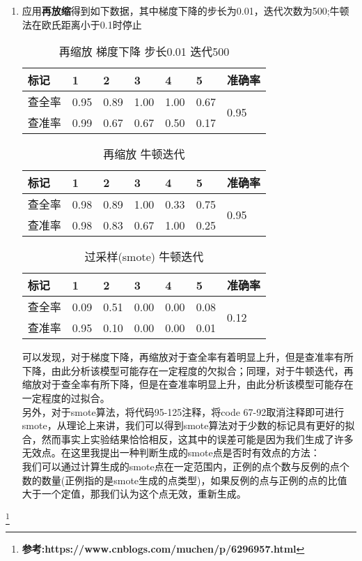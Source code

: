 \documentclass[a4paper,UTF8]{article}
\numberwithin{equation}{section}
\begin{document}
\begin{enumerate}[(1)]
	\item 应用\textbf{再放缩}得到如下数据，其中梯度下降的步长为0.01，迭代次数为500;牛顿法在欧氏距离小于0.1时停止
		\begin{table}[!h]
		\centering
		\caption{再缩放 梯度下降 步长0.01 迭代500}
		\label{}
		\begin{tabular}{l|llllll}
			\hline
			标记  & 1    & 2    & 3    & 4    & 5    & 准确率                   \\ \hline
			查全率 & 0.95 & 0.89 & 1.00 & 1.00 & 0.67 & \multirow{2}{*}{0.95} \\ \cline{1-1}
			查准率 & 0.99 & 0.67 & 0.67 & 0.50 & 0.17 &                       \\ \hline
		\end{tabular}
	\end{table}
	
	\begin{table}[!h]
		\centering
		\caption{再缩放 牛顿迭代}
		\label{}
		\begin{tabular}{l|llllll}
			\hline
			标记  & 1    & 2    & 3    & 4    & 5    & 准确率                   \\ \hline
			查全率 & 0.98 & 0.89 & 1.00 & 0.33 & 0.75 & \multirow{2}{*}{0.95} \\ \cline{1-1}
			查准率 & 0.98 & 0.83 & 0.67 & 1.00 & 0.25 &                       \\ \hline
		\end{tabular}
	\end{table}

	\begin{table}[!h]
	\centering
	\caption{过采样(smote) 牛顿迭代}
	\label{}
	\begin{tabular}{l|llllll}
		\hline
		标记  & 1    & 2    & 3    & 4    & 5    & 准确率                   \\ \hline
		查全率 & 0.09 & 0.51 & 0.00 & 0.00 & 0.08 & \multirow{2}{*}{0.12} \\ \cline{1-1}
		查准率 & 0.95 & 0.10 & 0.00 & 0.00 & 0.01 &                       \\ \hline
	\end{tabular}
	\end{table}
	可以发现，对于梯度下降，再缩放对于查全率有着明显上升，但是查准率有所下降，由此分析该模型可能存在一定程度的欠拟合；同理，对于牛顿迭代，再缩放对于查全率有所下降，但是在查准率明显上升，由此分析该模型可能存在一定程度的过拟合。\\
	另外，对于smote算法，将代码95-125注释，将code 67-92取消注释即可进行smote，从理论上来讲，我们可以得到smote算法对于少数的标记具有更好的拟合，然而事实上实验结果恰恰相反，这其中的误差可能是因为我们生成了许多无效点。在这里我提出一种判断生成的smote点是否时有效点的方法：\\
	我们可以通过计算生成的smote点在一定范围内，正例的点个数与反例的点个数的数量(正例指的是smote生成的点类型)，如果反例的点与正例的点的比值大于一个定值，那我们认为这个点无效，重新生成。
\end{enumerate}
\footnote{\textbf{参考:https://www.cnblogs.com/muchen/p/6296957.html}}
\end{document}
